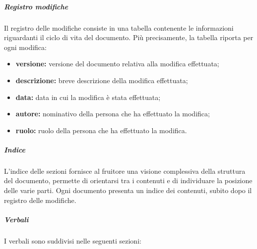 				\subparagraph{Registro modifiche}
					Il registro delle modifiche consiste in una tabella contenente le informazioni riguardanti il ciclo di vita del documento. Più precisamente, la tabella riporta per ogni modifica:
					\begin{itemize}
						\item \textbf{versione:} versione del documento relativa alla modifica effettuata;
						\item \textbf{descrizione:} breve descrizione della modifica effettuata;
						\item \textbf{data:} data in cui la modifica è stata effettuata;
						\item \textbf{autore:} nominativo della persona che ha effettuato la modifica;
						\item \textbf{ruolo:} ruolo della persona che ha effettuato la modifica.
					\end{itemize}
				\subparagraph{Indice}
				L’indice delle sezioni fornisce al fruitore una visione complessiva della struttura del documento, permette di orientarsi tra i contenuti e di individuare la posizione delle varie parti. Ogni documento presenta un indice dei contenuti, subito dopo il registro delle modifiche.
				\subparagraph{Verbali}
				I verbali sono suddivisi nelle seguenti sezioni:
